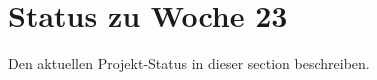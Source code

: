 \section{Status zu Woche 23
}\label{sec:status}

Den aktuellen Projekt-Status in  dieser section beschreiben.

